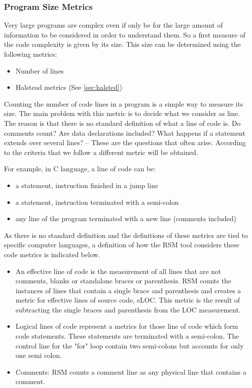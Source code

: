 \subsubsection{Program Size Metrics}
\label{sec:sizem}
Very large programs are complex even if only be for the large amount of information to be considered in order to understand them. So a first measure of the code complexity is given by its size. This size can be determined using the following metrics:
\begin{itemize}
\item Number of lines
\item Halstead metrics (See \ref{sec:halsted})
\end{itemize}

Counting the number of code lines in a program is a simple way to measure its size. The main problem with this metric is to decide what we consider as line.
The reason is that there is no standard definition of what a line of code is. Do comments count? Are data declarations included? What happens if a statement extends over several lines? – These are the questions that often arise. According to the criteria that we follow a different metric will be obtained.

For example, in C language, a line of code can be:
\begin{itemize}
\item a statement, instruction finished in a jump line
\item a statement, instruction terminated with a semi-colon
\item any line of the program terminated with a new line (comments included)
\end{itemize}

As there is no standard definition and the definitions of these metrics are tied to specific computer languages, a definition of how the RSM tool considers these code metrics is indicated below.

\begin{itemize}
\item An effective line of code is the measurement of all lines that are not comments, blanks or standalone braces or parenthesis. RSM counts the instances of lines that contain a single brace and parenthesis and creates a metric for effective lines of source code, eLOC. This metric is the result of subtracting the single braces and parenthesis from the LOC measurement.
\item Logical lines of code represent a metrics for those line of code which form code statements. These statements are terminated with a semi-colon. The control line for the "for" loop contain two semi-colons but accounts for only one semi colon.
\item Comments: RSM counts a comment line as any physical line that contains a comment.
\end{itemize}


